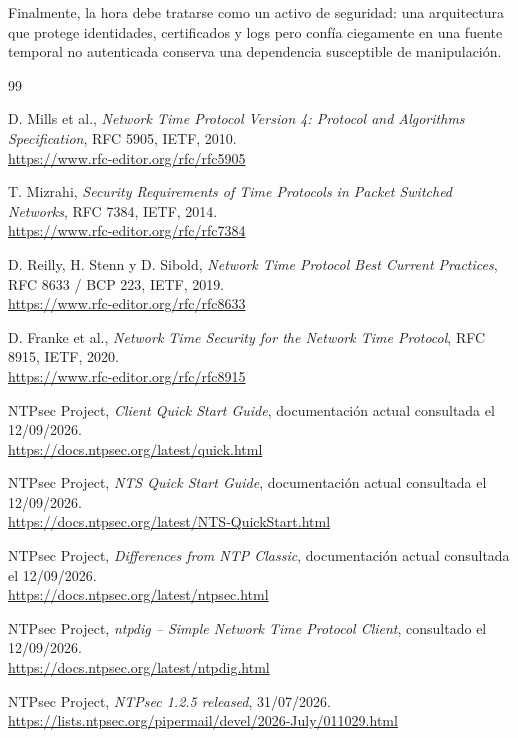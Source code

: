 \documentclass[11pt,a4paper]{article}
\begin{document}
Finalmente, la hora debe tratarse como un activo de seguridad: una arquitectura que protege identidades, certificados y logs pero confía ciegamente en una fuente temporal no autenticada conserva una dependencia susceptible de manipulación.

\newpage
\begin{thebibliography}{99}

D. Mills et al., \emph{Network Time Protocol Version 4: Protocol and Algorithms Specification}, RFC 5905, IETF, 2010.\\
\url{https://www.rfc-editor.org/rfc/rfc5905}

T. Mizrahi, \emph{Security Requirements of Time Protocols in Packet Switched Networks}, RFC 7384, IETF, 2014.\\
\url{https://www.rfc-editor.org/rfc/rfc7384}

D. Reilly, H. Stenn y D. Sibold, \emph{Network Time Protocol Best Current Practices}, RFC 8633 / BCP 223, IETF, 2019.\\
\url{https://www.rfc-editor.org/rfc/rfc8633}

D. Franke et al., \emph{Network Time Security for the Network Time Protocol}, RFC 8915, IETF, 2020.\\
\url{https://www.rfc-editor.org/rfc/rfc8915}

NTPsec Project, \emph{Client Quick Start Guide}, documentación actual consultada el 12/09/2026.\\
\url{https://docs.ntpsec.org/latest/quick.html}

NTPsec Project, \emph{NTS Quick Start Guide}, documentación actual consultada el 12/09/2026.\\
\url{https://docs.ntpsec.org/latest/NTS-QuickStart.html}

NTPsec Project, \emph{Differences from NTP Classic}, documentación actual consultada el 12/09/2026.\\
\url{https://docs.ntpsec.org/latest/ntpsec.html}

NTPsec Project, \emph{ntpdig -- Simple Network Time Protocol Client}, consultado el 12/09/2026.\\
\url{https://docs.ntpsec.org/latest/ntpdig.html}

NTPsec Project, \emph{NTPsec 1.2.5 released}, 31/07/2026.\\
\url{https://lists.ntpsec.org/pipermail/devel/2026-July/011029.html}


\end{thebibliography}
\end{document}
